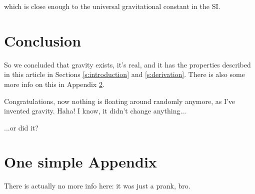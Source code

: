 \documentclass[preprint,12pt]{elsarticle}
\begin{document}
\noindent
which is close enough to the universal gravitational constant in the SI.

\section{Conclusion}

So we concluded that gravity exists, it's real, and it has the properties described in this article in Sections \ref{s:introduction} and \ref{s:derivation}. There is also some more info on this in Appendix \ref{s:appendix}.

Congratulations, now nothing is floating around randomly anymore, as I've invented gravity. Haha! I know, it didn't change anything...

\noindent
...or did it?

  
 

\newpage
\appendix
\section{One simple Appendix}\label{s:appendix}

There is actually no more info here: it was just a prank, bro.
\end{document}
